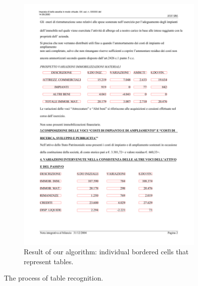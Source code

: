 \begin{figure}[p]
\begin{subfigure}{0.45\textwidth}
\includegraphics[width=\linewidth]{img/implementation/implem4.png}
\caption{Result of our algorithm: individual bordered cells that represent tables.}
\label{fig:implem4}
\end{subfigure}
\caption{The process of table recognition.}
\label{fig:implemTableRecogniton}
\end{figure}
